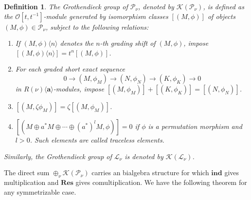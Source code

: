 \documentclass[10pt,a4paper]{amsart}
\newtheorem{definition}[theorem]{Definition}
\def\Res{\mathbf{Res}}
\def\ind{\mathbf{ind}}
\begin{document}
\begin{definition}
The Grothendieck group of $\mathcal{P}_{\nu}$, denoted by $\mathcal{K}(\mathcal{P}_{\nu})$, is defined as the $\mathcal{O}[t, t^{-1}]$-module generated by isomorphism classes $[(M,\phi)]$ of objects $(M,\phi)\in \mathcal{P}_{\nu}$, subject to the following relations:
\begin{enumerate}
    \item If $(M,\phi)\langle n\rangle$ denotes the $n$-th grading shift of $(M,\phi)$, impose $[(M,\phi)\langle n\rangle] = t^{n}[(M,\phi)]$.
    \item For each graded short exact sequence
    \[
    0 \to (M,\phi_M) \to (N,\phi_N) \to (K,\phi_K) \to 0
    \]
    in $R(\nu)\langle\mathbf{a}\rangle$-modules, impose $[(M,\phi_M)] + [(K,\phi_K)] = [(N,\phi_N)]$.
    \item $[(M,\zeta \phi_M)] = \zeta [(M,\phi_M)]$.
    \item $[(M \oplus a^* M \oplus \cdots \oplus (a^*)^l M, \phi)] = 0$ if $\phi$ is a permutation morphism and $l > 0$. Such elements are called traceless elements.
\end{enumerate}
Similarly, the Grothendieck group of $\mathcal{L}_{\nu}$ is denoted by $\mathcal{K}(\mathcal{L}_{\nu})$.
\end{definition}

The direct sum $\oplus_{\nu}\mathcal{K}(\mathcal{P}_{\nu})$ carries an bialgebra structure for which $\ind$ gives multiplication and $\Res$ gives comultiplication.
We have the following theorem for any symmetrizable case.
\end{document}
